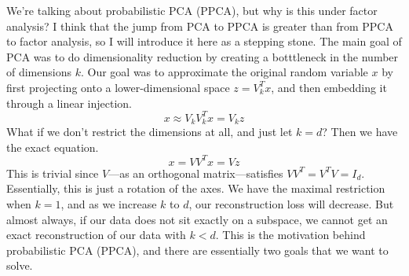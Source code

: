   We're talking about probabilistic PCA (PPCA), but why is this under factor analysis? I think that the jump from PCA to PPCA is greater than from PPCA to factor analysis, so I will introduce it here as a stepping stone. The main goal of PCA was to do dimensionality reduction by creating a botttleneck in the number of dimensions $k$. Our goal was to approximate the original random variable $x$ by first projecting onto a lower-dimensional space $z = V_k^T x$, and then embedding it through a linear injection. 
  \begin{equation}
    x \approx V_k V_k^T x = V_k z 
  \end{equation} 
  What if we don't restrict the dimensions at all, and just let $k = d$? Then we have the exact equation. 
  \begin{equation}
    x = V V^T x = V z
  \end{equation}
  This is trivial since $V$---as an orthogonal matrix---satisfies $V V^T = V^T V = I_d$. Essentially, this is just a rotation of the axes. We have the maximal restriction when $k = 1$, and as we increase  $k$ to $d$, our reconstruction loss will decrease. But almost always, if our data does not sit exactly on a subspace, we cannot get an exact reconstruction of our data with $k < d$. This is the motivation behind probabilistic PCA (PPCA), and there are essentially two goals that we want to solve. \cite{1999tipping} 
